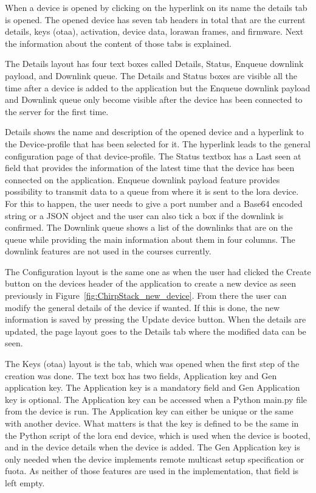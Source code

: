 When a device is opened by clicking on the hyperlink on its name the details tab is opened.
The opened device has seven tab headers in total that are the current details, keys (\gls{otaa}), activation, device data, \gls{lorawan} frames, and firmware.
Next the information about the content of those tabs is explained.

The Details layout has four text boxes called Details, Status, Enqueue downlink payload, and Downlink queue.
The Details and Status boxes are visible all the time after a device is added to the application but the Enqueue downlink payload and Downlink queue only become visible after the device has been connected to the server for the first time.

Details shows the name and description of the opened device and a hyperlink to the Device-profile that has been selected for it.
The hyperlink leads to the general configuration page of that device-profile.
The Status textbox has a Last seen at field that provides the information of the latest time that the device has been connected on the application.
Enqueue downlink payload feature provides possibility to transmit data to a queue from where it is sent to the \gls{lora} device. For this to happen, the user needs to give a port number and a Base64 encoded string or a JSON object and the user can also tick a box if the downlink is confirmed.
The Downlink queue shows  a list of the downlinks that are on the queue while providing the main information about them in four columns.
The downlink features are not used in the courses currently.

The Configuration layout is the same one as when the user had clicked the Create button on the devices header of the application to create a new device as seen previously in Figure~\ref{fig:ChirpStack_new_device}.
From there the user can modify the general details of the device if wanted.
If this is done, the new information is saved by pressing the Update device button.
When the details are updated, the page layout goes to the Details tab where the modified data can be seen.

The Keys (\gls{otaa}) layout is the tab, which was opened when the first step of the creation was done.
The text box has two fields, Application key and Gen application key.
The Application key is a mandatory field and Gen Application key is optional.
The Application key can be accessed when a Python main.py file from the device is run.
The Application key can either be unique or the same with another device.
What matters is that the key is defined to be the same in the Python script of the \gls{lora} end device, which is used when the device is booted, and in the device details when the device is added.
The Gen Application key is only needed when the device implements remote multicast setup specification or \gls{fuota}.
As neither of those features are used in the implementation, that field is left empty.

